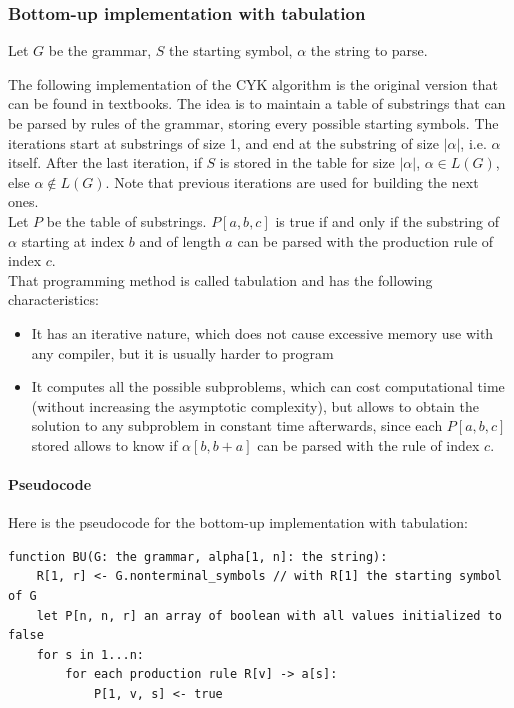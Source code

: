 \documentclass[12pt]{extarticle}
\begin{document}
\begin{multicols}{2}
\subsubsection{Bottom-up implementation with tabulation}
Let $G$ be the grammar, $S$ the starting symbol, $\alpha$ the string to parse.\par

The following implementation of the CYK algorithm is the original
version that can be found in textbooks. The idea is to maintain a table of
substrings that can be parsed by rules of the grammar, storing every possible
starting symbols. The iterations start at substrings of size 1, and end at the
substring of size $|\alpha|$, i.e. $\alpha$ itself. After the last iteration, if
$S$ is stored in the table for size
$|\alpha|$, $\alpha\in L(G)$, else $\alpha\not\in L(G)$. Note that previous iterations are used for building the next ones.\\
Let $P$ be the table of substrings. $P[a,b,c]$ is true if and only if the substring of
$\alpha$ starting at index $b$ and of length $a$ can be parsed with the production rule of index $c$.\\
That programming method is called tabulation and has the following characteristics:
\begin{itemize}
\item It has an iterative nature, which does not cause excessive memory use with any compiler, but it is usually harder to program
  \item It computes all the possible subproblems, which can cost 
    computational time (without increasing the asymptotic complexity), but
    allows to obtain the solution to any subproblem in constant time afterwards, since
    each $P[a,b,c]$ stored allows to know if $\alpha[b,b+a]$ can be parsed with
    the rule of index $c$.
\end{itemize}

\paragraph{Pseudocode} Here is the pseudocode for the bottom-up implementation
with tabulation:
\begin{lstlisting}
function BU(G: the grammar, alpha[1, n]: the string):
    R[1, r] <- G.nonterminal_symbols // with R[1] the starting symbol of G
    let P[n, n, r] an array of boolean with all values initialized to false
    for s in 1...n:
        for each production rule R[v] -> a[s]:
            P[1, v, s] <- true
    

\end{lstlisting}
\end{multicols}
\end{document}
